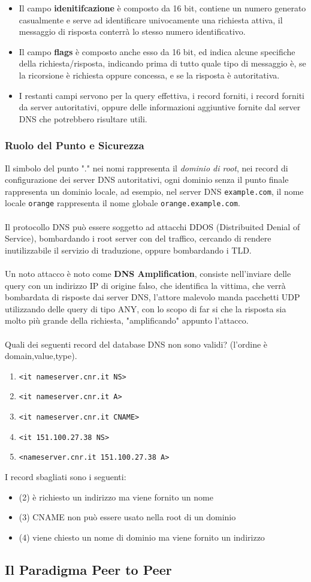 \documentclass[12pt, letterpaper]{article}
\newcommand{\code}[1]{\colorbox{light-gray}{\texttt{#1}}}
\newcommand{\acc}{\\\hphantom{}\\}
\begin{document}
\begin{itemize}
    \item Il campo \textbf{idenitifcazione} è composto da 16 bit, contiene un numero generato casualmente 
    e serve ad identificare univocamente una richiesta attiva, il messaggio di risposta conterrà lo stesso 
    numero identificativo.
    \item Il campo \textbf{flags} è composto anche esso da 16 bit, ed indica alcune specifiche della 
    richiesta/risposta, indicando prima di tutto quale  tipo di messaggio è, se la ricorsione è richiesta 
    oppure concessa, e se la risposta è autoritativa. 
    \item I restanti campi servono per la query effettiva, i record forniti, i record forniti da server 
    autoritativi, oppure delle informazioni aggiuntive fornite dal server DNS che potrebbero risultare utili.
\end{itemize}
\subsubsection{Ruolo del Punto e Sicurezza}
Il simbolo del punto "." nei nomi rappresenta il \textit{dominio di root}, nei record di configurazione 
dei server DNS autoritativi, ogni dominio senza il punto finale rappresenta un dominio locale, ad esempio, 
nel server DNS \code{example.com}, il nome locale \code{orange} rappresenta il nome 
globale \code{orange.example.com}.\acc 
Il protocollo DNS può essere soggetto ad attacchi DDOS (Distribuited Denial of Service), bombardando i 
root server con del traffico, cercando di rendere inutilizzabile il servizio di traduzione, oppure 
bombardando i TLD.\acc 
Un noto attacco è noto come \textbf{DNS Amplification}, consiste nell'inviare delle query con un indirizzo 
IP di origine falso, che identifica la vittima, che verrà bombardata di risposte dai server DNS, l'attore malevolo 
manda pacchetti UDP utilizzando delle query di tipo ANY, con lo scopo di far si che la risposta sia 
molto più grande della richiesta, "amplificando" appunto l'attacco.\acc
    Quali dei seguenti record del database DNS non sono validi? (l'ordine è domain,value,type).\begin{enumerate}
        \item \code{<it nameserver.cnr.it NS>}
        \item \code{<it nameserver.cnr.it A>}
        \item \code{<it nameserver.cnr.it CNAME>}
        \item \code{<it 151.100.27.38 NS>}
        \item \code{<nameserver.cnr.it 151.100.27.38 A>}
    \end{enumerate}
I record sbagliati sono i seguenti:\begin{itemize}
    \item \color{red}(2) \color{black} è richiesto un indirizzo ma viene fornito un nome 
    \item  \color{red}(3) \color{black} CNAME non può essere usato nella root di un dominio 
    \item \color{red}(4) \color{black} viene chiesto un nome di dominio ma viene fornito un indirizzo
\end{itemize}
\subsection{Il Paradigma Peer to Peer}
\end{document}
